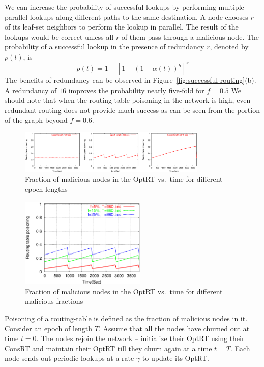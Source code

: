 \documentclass[10pt,twocolumn]{article}
\newcommand{\PRT}{OptRT\xspace}
\newcommand{\CRT}{ConsRT\xspace}
\begin{document}
We can increase the probability of successful lookups by performing
multiple parallel lookups along different paths to the same
destination. A node chooses $r$ of its leaf-set neighbors to perform the lookup in parallel. The result of the lookups would be correct unless all $r$ of them pass through a malicious node. The probability of a successful lookup in the presence of redundancy $r$, denoted by $p(t)$, is
\begin{equation}
p(t)= 1-\left[1-(1-\alpha(t))^h\right]^r
\label{eqn:successful-redundancy}
\end{equation}
The benefits of redundancy can be observed in
Figure~\ref{fig:successful-routing}(b). A redundancy of $16$ improves
the probability nearly five-fold for $f=0.5$ We
should note that when the routing-table poisoning in the network is high, even redundant routing does not provide much success as can be seen from the portion of the graph beyond $f=0.6$.
\begin{figure}
\centerline{\includegraphics[width=0.8\textwidth]{graphs/equations/poisoning-T}}
\caption{Fraction of malicious nodes in the \PRT vs.\ time for
  different epoch lengths} 
\label{fig:poisoning-T}
\end{figure}

\begin{figure}
\centerline{\includegraphics[width=6cm]{graphs/equations/poisoning-f}}
\caption{Fraction of malicious nodes in the \PRT vs.\ time for different malicious fractions}
\label{fig:poisoning-f}
\end{figure}

\SubSection{Poisoning in the \PRT}
Poisoning of a routing-table is defined as the fraction of malicious nodes in it. Consider an epoch of length $T$. Assume that all the nodes have churned out at time $t=0$. The nodes rejoin the network -- initialize their \PRT using their \CRT and maintain their \PRT till they churn again at a time $t=T$. Each node sends out periodic lookups at a rate $\gamma$ to update its \PRT. 
\end{document}
